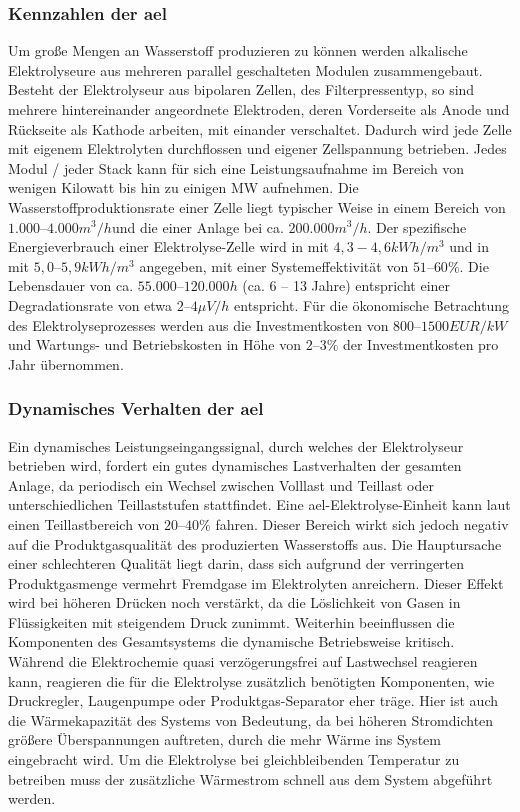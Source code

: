 \documentclass[onecolumn,10pt,titlepage]{article}
\begin{document}
			\subsubsection*{Kennzahlen der \gls{ael}}
			Um große Mengen an Wasserstoff produzieren zu können werden alkalische Elektrolyseure aus mehreren parallel geschalteten Modulen zusammengebaut. Besteht der Elektrolyseur aus bipolaren Zellen, des Filterpressentyp, so sind mehrere hintereinander angeordnete Elektroden, deren Vorderseite als Anode und Rückseite als Kathode arbeiten, mit einander verschaltet.\cite{Kurzweil.2015} Dadurch wird jede Zelle mit eigenem Elektrolyten durchflossen und eigener Zellspannung betrieben. Jedes Modul / jeder Stack kann für sich eine Leistungsaufnahme im Bereich von wenigen Kilowatt bis hin zu einigen MW aufnehmen.\cite{Smolinka.05.07.2011}  Die Wasserstoffproduktionsrate einer Zelle liegt typischer Weise in einem Bereich von $1.000–4.000 m^3/h$und die einer Anlage bei ca. $200.000 m^3/h$.\cite{Kurzweil.2015} Der spezifische Energieverbrauch einer Elektrolyse-Zelle wird in \cite{Kurzweil.2015} mit $4,3-4,6 kWh/m^3$ und in \cite{Buttler.2018} mit $5,0–5,9 kWh/m^3$ angegeben, mit einer Systemeffektivität von $51–60\%$. Die Lebensdauer von ca. $55.000–120.000h$ (ca. 6 – 13 Jahre) entspricht einer Degradationsrate von etwa $2–4 \mu V/h$ entspricht.\cite{Buttler.2018} Für die ökonomische Betrachtung des Elektrolyseprozesses werden aus \cite{Buttler.2018} die Investmentkosten von $800 – 1500 EUR/kW$ und Wartungs- und Betriebskosten in Höhe von $2 – 3 \%$ der Investmentkosten pro Jahr übernommen.
			\subsubsection*{Dynamisches Verhalten der \gls{ael}}
			Ein dynamisches Leistungseingangssignal, durch welches der Elektrolyseur betrieben wird, fordert ein gutes dynamisches Lastverhalten der gesamten Anlage, da periodisch ein Wechsel zwischen Volllast und Teillast oder unterschiedlichen Teillaststufen stattfindet. Eine \gls{ael}-Elektrolyse-Einheit kann laut \cite{Smolinka.05.07.2011} einen Teillastbereich von $20–40 \%$ fahren. Dieser Bereich wirkt sich jedoch negativ auf die Produktgasqualität des produzierten Wasserstoffs aus. Die Hauptursache einer schlechteren Qualität liegt darin, dass sich aufgrund der verringerten Produktgasmenge vermehrt Fremdgase im Elektrolyten anreichern. Dieser Effekt wird bei höheren Drücken noch verstärkt, da die Löslichkeit von Gasen in Flüssigkeiten mit steigendem Druck zunimmt. Weiterhin beeinflussen die Komponenten des Gesamtsystems die dynamische Betriebsweise kritisch. Während die Elektrochemie quasi verzögerungsfrei auf Lastwechsel reagieren kann, reagieren die für die Elektrolyse zusätzlich benötigten Komponenten, wie Druckregler, Laugenpumpe oder Produktgas-Separator eher träge. Hier ist auch die Wärmekapazität des Systems von Bedeutung, da bei höheren Stromdichten größere Überspannungen auftreten, durch die mehr Wärme ins System eingebracht wird. Um die Elektrolyse bei gleichbleibenden Temperatur zu betreiben muss der zusätzliche Wärmestrom schnell aus dem System abgeführt werden.
\end{document}
